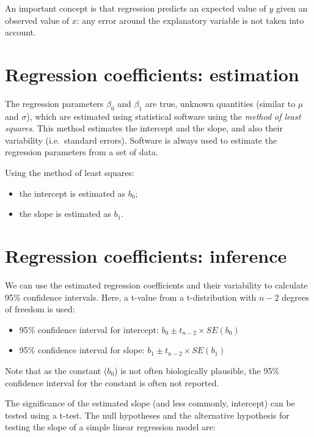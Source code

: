\documentclass[
  a4paper,
]{memoir}
\providecommand{\tightlist}{%
  \setlength{\itemsep}{0pt}\setlength{\parskip}{0pt}}
\begin{document}
An important concept is that regression predicts an expected value of
\(y\) given an observed value of \(x\): any error around the explanatory
variable is not taken into account.

\section{Regression coefficients:
estimation}\label{regression-coefficients-estimation}

The regression parameters \(\beta_{0}\) and \(\beta_{1}\) are true,
unknown quantities (similar to \(\mu\) and \(\sigma\)), which are
estimated using statistical software using the \emph{method of least
squares}. This method estimates the intercept and the slope, and also
their variability (i.e.~standard errors). Software is always used to
estimate the regression parameters from a set of data.

Using the method of least squares:

\begin{itemize}
\tightlist
\item
  the intercept is estimated as \(b_0\);
\item
  the slope is estimated as \(b_1\).
\end{itemize}

\section{Regression coefficients:
inference}\label{regression-coefficients-inference}

We can use the estimated regression coefficients and their variability
to calculate 95\% confidence intervals. Here, a t-value from a
t-distribution with \(n - 2\) degrees of freedom is used:

\begin{itemize}
\tightlist
\item
  95\% confidence interval for intercept:
  \(b_0 \pm t_{n-2} \times SE(b_0)\)
\item
  95\% confidence interval for slope: \(b_1 \pm t_{n-2} \times SE(b_1)\)
\end{itemize}

Note that as the constant (\(b_0\)) is not often biologically plausible,
the 95\% confidence interval for the constant is often not reported.

The significance of the estimated slope (and less commonly, intercept)
can be tested using a t-test. The null hypotheses and the alternative
hypothesis for testing the slope of a simple linear regression model
are:
\end{document}
